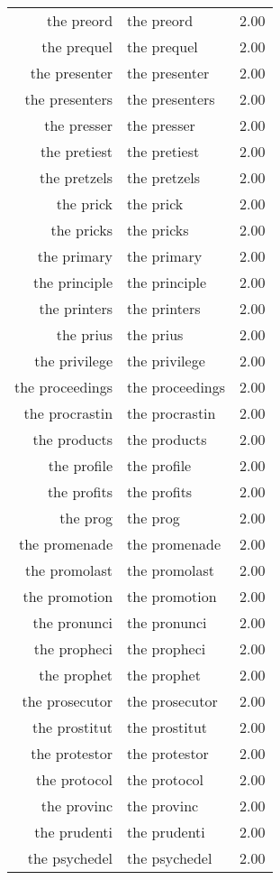 \begin{table}[ht]
\begin{tabular}{rlr}
  the preord & the preord & 2.00 \\ 
  the prequel & the prequel & 2.00 \\ 
  the presenter & the presenter & 2.00 \\ 
  the presenters & the presenters & 2.00 \\ 
  the presser & the presser & 2.00 \\ 
  the pretiest & the pretiest & 2.00 \\ 
  the pretzels & the pretzels & 2.00 \\ 
  the prick & the prick & 2.00 \\ 
  the pricks & the pricks & 2.00 \\ 
  the primary & the primary & 2.00 \\ 
  the principle & the principle & 2.00 \\ 
  the printers & the printers & 2.00 \\ 
  the prius & the prius & 2.00 \\ 
  the privilege & the privilege & 2.00 \\ 
  the proceedings & the proceedings & 2.00 \\ 
  the procrastin & the procrastin & 2.00 \\ 
  the products & the products & 2.00 \\ 
  the profile & the profile & 2.00 \\ 
  the profits & the profits & 2.00 \\ 
  the prog & the prog & 2.00 \\ 
  the promenade & the promenade & 2.00 \\ 
  the promolast & the promolast & 2.00 \\ 
  the promotion & the promotion & 2.00 \\ 
  the pronunci & the pronunci & 2.00 \\ 
  the propheci & the propheci & 2.00 \\ 
  the prophet & the prophet & 2.00 \\ 
  the prosecutor & the prosecutor & 2.00 \\ 
  the prostitut & the prostitut & 2.00 \\ 
  the protestor & the protestor & 2.00 \\ 
  the protocol & the protocol & 2.00 \\ 
  the provinc & the provinc & 2.00 \\ 
  the prudenti & the prudenti & 2.00 \\ 
  the psychedel & the psychedel & 2.00 \\ 

\end{tabular}
\end{table}
